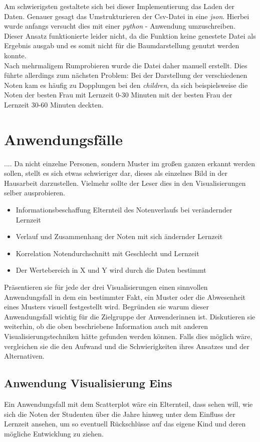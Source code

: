 \documentclass[usegeometry=true]{scrartcl}
\begin{document}
\noindent Am schwierigsten gestaltete sich bei dieser Implementierung das Laden der Daten. Genauer gesagt das Umstrukturieren der Csv-Datei in eine \textit{json}. Hierbei wurde anfangs versucht dies mit einer \textit{python} - Anwendung umzuschreiben. Dieser Ansatz funktionierte leider nicht, da die Funktion keine genestete Datei als Ergebnis ausgab und es somit nicht für die Baumdarstellung genutzt werden konnte. \\
Nach mehrmaligem Rumprobieren wurde die Datei daher manuell erstellt. Dies führte allerdings zum nächsten Problem: Bei der Darstellung der verschiedenen Noten kam es häufig zu Dopplungen bei den \textit{children}, da sich beispielsweise die Noten der besten Frau mit Lernzeit 0-30 Minuten mit der besten Frau der Lernzeit 30-60 Minuten deckten. %



\section{Anwendungsfälle}

.... Da nicht einzelne Personen, sondern Muster im großen ganzen erkannt werden sollen, stellt es sich etwas schwieriger dar, dieses als einzelnes Bild in der Hausarbeit darzustellen. Vielmehr sollte der Leser dies in den Visualisierungen selber ausprobieren.

\begin{itemize}
\item Informationsbeschaffung Elternteil des Notenverlaufs bei verändernder Lernzeit
\item Verlauf und Zusammenhang der Noten mit sich ändernder Lernzeit
\item Korrelation Notendurchschnitt mit Geschlecht und Lernzeit
\item Der Wertebereich in X und Y wird durch die Daten bestimmt
\end{itemize}

Präsentieren sie für jede der drei Visualisierungen einen sinnvollen Anwendungsfall in dem ein bestimmter Fakt, ein Muster oder die Abwesenheit eines Musters visuell festgestellt wird. Begründen sie warum dieser Anwendungsfall wichtig für die Zielgruppe der Anwenderinnen ist. Diskutieren sie weiterhin, ob die oben beschriebene Information auch mit anderen Visualisierungstechniken hätte gefunden werden können. Falls dies möglich wäre, vergleichen sie die den Aufwand und die Schwierigkeiten ihres Ansatzes und der Alternativen. 
\subsection{Anwendung Visualisierung Eins}
\label{AnwEins}
Ein Anwendungsfall mit dem Scatterplot wäre ein Elternteil, dass sehen will, wie sich die Noten der Studenten über die Jahre hinweg unter dem Einfluss der Lernzeit ansehen, um so eventuell Rückschlüsse auf das eigene Kind und deren mögliche Entwicklung zu ziehen.\\
\end{document}
